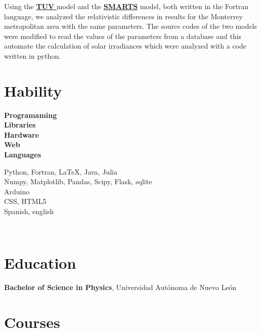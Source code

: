 \documentclass[a3paper]{adcv_color}
\newcommand*{\tuv}{\href{https://www2.acom.ucar.edu/modeling/tropospheric-ultraviolet-and-visible-tuv-radiation-model}{\textbf{TUV }}}
\begin{document}
\begin{multicols}{2}
    Using the \tuv model and the
    \href{https://www.nrel.gov/grid/solar-resource/smarts.html}{\textbf{SMARTS}} model, both written in the Fortran language, we analyzed the relativistic differences in
      results for the Monterrey metropolitan area with the same parameters. The source codes of the two models were modified to read the values of the parameters 
      from a database and this automate the calculation of solar irradiances which were analyzed with a code written in python.
  \end{multicols}
  \begin{multicols}{2}

\section{Hability}

\begin{minipage}{0.25\linewidth}
  \begin{flushright}
    \textbf{Programaming}\\
    \textbf{Libraries}
    \vspace{0.4cm}\\
    \textbf{Hardware}\\
    \textbf{Web}\\
    \textbf{Languages}
  \end{flushright}
\end{minipage}
\hspace{0.3cm}
\begin{minipage}{0.75\linewidth}
  \vspace{0.25cm}
  Python, Fortran, LaTeX, Java, Julia\\
  Numpy, Matplotlib, Pandas, Scipy, Flask, sqlite\\
  Arduino\\
  CSS, HTML5\\
  Spanish, english
\end{minipage}
\vspace{2cm}\\
\section{Education}

\textbf{Bachelor of Science in Physics}, Universidad Autónoma de Nuevo León\\

\section{Courses}


\end{multicols}
\end{document}

